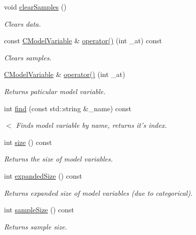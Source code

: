 \begin{DoxyCompactItemize}
\item 
void \hyperlink{class_go_s_u_m_1_1_c_model_variables_a5a7a04ad12b2d23d0921cded3d7121de}{clear\-Samples} ()
\begin{DoxyCompactList}\small\item\em Clears data. \end{DoxyCompactList}\item 
const \hyperlink{class_go_s_u_m_1_1_c_model_variable}{C\-Model\-Variable} \& \hyperlink{class_go_s_u_m_1_1_c_model_variables_af311763812d7724409678b8fc87f237c}{operator()} (int \-\_\-at) const 
\begin{DoxyCompactList}\small\item\em Clears samples. \end{DoxyCompactList}\item 
\hyperlink{class_go_s_u_m_1_1_c_model_variable}{C\-Model\-Variable} \& \hyperlink{class_go_s_u_m_1_1_c_model_variables_a08d7808b67e19ba1f97603901f80cff9}{operator()} (int \-\_\-at)
\begin{DoxyCompactList}\small\item\em Returns paticular model variable. \end{DoxyCompactList}\item 
int \hyperlink{class_go_s_u_m_1_1_c_model_variables_ac78a93b9814e6b053f3cd7d72ccfa794}{find} (const std\-::string \&\-\_\-name) const 
\begin{DoxyCompactList}\small\item\em $<$ Finds model variable by name, returns it's index. \end{DoxyCompactList}\item 
int \hyperlink{class_go_s_u_m_1_1_c_model_variables_a3c9ed3cad5fd7c1773a2b13d2e0d4cbe}{size} () const 
\begin{DoxyCompactList}\small\item\em Returns the size of model variables. \end{DoxyCompactList}\item 
int \hyperlink{class_go_s_u_m_1_1_c_model_variables_a0fb75174963bd1a9ce6f6969c5bc57ab}{expanded\-Size} () const 
\begin{DoxyCompactList}\small\item\em Returns expanded size of model variables (due to categorical). \end{DoxyCompactList}\item 
int \hyperlink{class_go_s_u_m_1_1_c_model_variables_aaa7564978d3d08d4f9ab0a3c58f59239}{sample\-Size} () const 
\begin{DoxyCompactList}\small\item\em Returns sample size. \end{DoxyCompactList}\item 

\end{DoxyCompactItemize}
